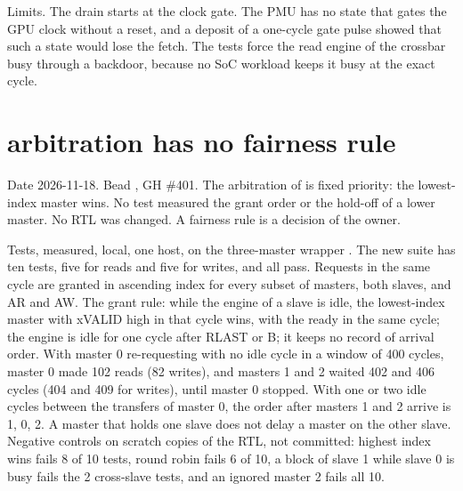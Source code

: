 \begin{record}

Limits. The drain starts at the clock gate. The PMU has no state that gates the GPU clock without a reset, and a deposit of a one-cycle gate pulse showed that such a state would lose the fetch. The tests force the read engine of the crossbar busy through a backdoor, because no SoC workload keeps it busy at the exact cycle.

\end{record}

\section{ arbitration has no fairness rule}\label{cr:defect:crossbar-fixed-priority}

\begin{record}

Date 2026-11-18. Bead , GH \#401. The arbitration of  is fixed priority: the lowest-index master wins. No test measured the grant order or the hold-off of a lower master. No RTL was changed. A fairness rule is a decision of the owner.

\end{record}

\begin{record}

Tests, measured, local, one host, on the three-master wrapper . The new suite  has ten tests, five for reads and five for writes, and all pass. Requests in the same cycle are granted in ascending index for every subset of masters, both slaves, and AR and AW. The grant rule: while the engine of a slave is idle, the lowest-index master with xVALID high in that cycle wins, with the ready in the same cycle; the engine is idle for one cycle after RLAST or B; it keeps no record of arrival order. With master 0 re-requesting with no idle cycle in a window of 400 cycles, master 0 made 102 reads (82 writes), and masters 1 and 2 waited 402 and 406 cycles (404 and 409 for writes), until master 0 stopped. With one or two idle cycles between the transfers of master 0, the order after masters 1 and 2 arrive is 1, 0, 2. A master that holds one slave does not delay a master on the other slave. Negative controls on scratch copies of the RTL, not committed: highest index wins fails 8 of 10 tests, round robin fails 6 of 10, a block of slave 1 while slave 0 is busy fails the 2 cross-slave tests, and an ignored master 2 fails all 10.

\end{record}

